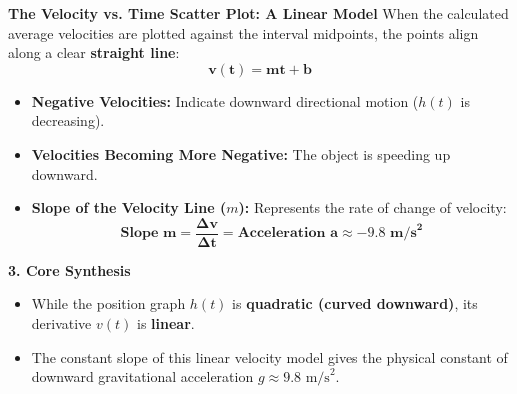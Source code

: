 \documentclass[10.5pt]{article}
\begin{document}
\vspace{0.03in}

\begin{tcolorbox}[colback=boxbg, colframe=boxframe, boxrule=0.8pt, arc=3pt, left=8pt, right=8pt, top=4pt, bottom=4pt]
\textbf{\large The Velocity vs. Time Scatter Plot: A Linear Model}
When the calculated average velocities are plotted against the interval midpoints, the points align along a clear \textbf{straight line}:
\[
  \mathbf{v(t) = m t + b}
\]
\begin{itemize}[leftmargin=1.2em, topsep=1pt, itemsep=3pt]
  \item \textbf{Negative Velocities:} Indicate downward directional motion ($h(t)$ is decreasing).
  \item \textbf{Velocities Becoming More Negative:} The object is speeding up downward.
  \item \textbf{Slope of the Velocity Line ($m$):} Represents the rate of change of velocity:
  \[
    \mathbf{\text{Slope } m = \frac{\Delta v}{\Delta t} = \text{Acceleration } a \approx -9.8\text{ m/s}^2}
  \]
\end{itemize}
\end{tcolorbox}

\vspace{0.04in}

\textbf{\large 3. Core Synthesis}

\begin{tcolorbox}[colback=chalkblue!6, colframe=chalkblue, boxrule=1pt, arc=3pt, left=8pt, right=8pt, top=4pt, bottom=4pt]
\begin{itemize}[leftmargin=1.2em, topsep=1pt, itemsep=2pt]
  \item While the position graph $h(t)$ is \textbf{quadratic (curved downward)}, its derivative $v(t)$ is \textbf{linear}.
  \item The constant slope of this linear velocity model gives the physical constant of downward gravitational acceleration $g \approx 9.8\text{ m/s}^2$.
\end{itemize}
\end{tcolorbox}
\end{document}
